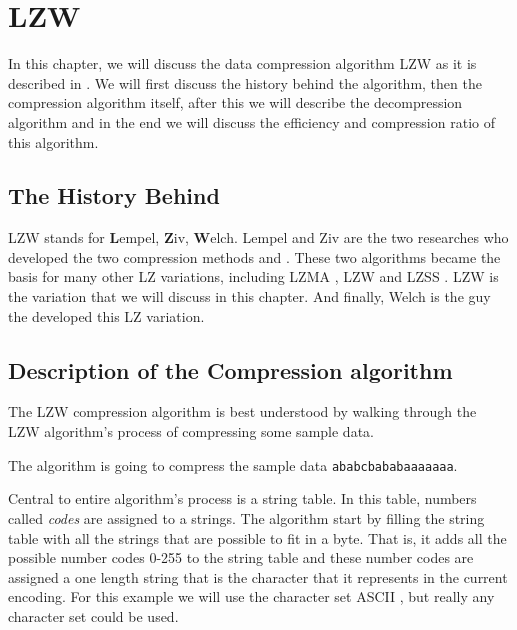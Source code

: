 \begin{comment}
  
\end{comment}

\chapter{LZW}
\label{cha:lzw}

\begin{refsection}

  In this chapter, we will discuss the data compression algorithm LZW
  as it is described in
  \cite{nelson89:_lzw_data_compr,Welch:1984:THD:1319729.1320134,Salomon:2004:DCC}. We
  will first discuss the history behind the algorithm, then the
  compression algorithm itself, after this we will describe the
  decompression algorithm and in the end we will discuss the
  efficiency and compression ratio of this algorithm.

\section{The History Behind}

LZW stands for \textbf{L}empel, \textbf{Z}iv, \textbf{W}elch. Lempel
and Ziv are the two researches who developed the two compression
methods \lzseven and \lzeight. These two algorithms became the basis
for many other LZ variations, including LZMA \cite{palov11}, LZW and
LZSS \cite{Salomon:2004:DCC}. LZW is the variation that we will
discuss in this chapter. And finally, Welch is the guy the developed
this LZ variation.

\section{Description of the Compression algorithm}
\label{sec:lzw-comp-desc}

The LZW compression algorithm is best
understood by walking through the LZW algorithm's process of
compressing some sample data.

The algorithm is going to compress the sample data
\texttt{ababcbababaaaaaaa}.

Central to entire algorithm's process is a string table. In this
table, numbers called \textit{codes} are assigned to a
strings. The algorithm start by filling the string table with all the
strings that are possible to fit in a byte. That is, it adds all the
possible number codes 0-255 to the string table and these number codes
are assigned a one length string that is the character that it
represents in the current encoding. For this example we will use the
character set ASCII \cite{rfc20}, but really any character set could
be used.


\end{refsection}
